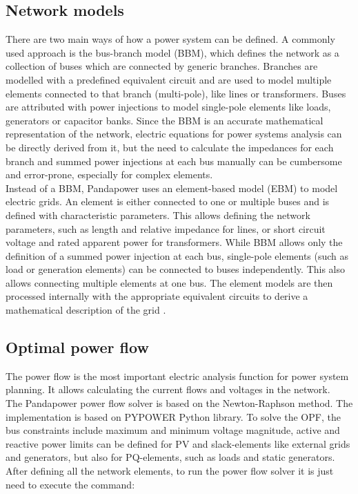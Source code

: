\subsection{Network models}
There are two main ways of how a power system can be defined.
A commonly used approach is the bus-branch model (BBM), which defines the network as a collection of buses which are connected by generic branches. Branches are modelled with a predefined equivalent circuit and are used to model multiple elements connected to that branch (multi-pole), like lines or transformers. Buses are attributed with power injections to model single-pole elements like loads, generators or capacitor banks. Since the BBM is an accurate mathematical representation of the network, electric equations for power systems analysis can be directly derived from it, but the need to calculate the impedances for each branch and summed power injections at each bus manually can be cumbersome and error-prone, especially for complex elements. \\
Instead of a BBM, Pandapower uses an element-based model (EBM) to model electric grids. An element is either connected to one or multiple buses and is defined with characteristic parameters. This allows defining the network parameters, such as length and relative impedance for lines, or short circuit voltage and rated apparent power for transformers. While BBM allows only the definition of a summed power injection at each bus, single-pole elements (such as load or generation elements) can be connected to buses independently. This also allows connecting multiple elements at one bus. The element models are then processed internally with the appropriate equivalent circuits to derive a mathematical description of the grid \cite{pandapower}.

\subsection{Optimal power flow}
The power flow is the most important electric analysis function for power system planning. It allows calculating the current flows and voltages in the network. \\
The Pandapower power flow solver is based on the Newton-Raphson method. The implementation is based on PYPOWER Python library. To solve the \gls{OPF}, the bus constraints include maximum and minimum voltage magnitude, active and reactive power limits can be defined for PV and slack-elements like external grids and generators, but also for PQ-elements, such as loads and static generators. \\
After defining all the network elements, to run the power flow solver it is just need to execute the command: 

